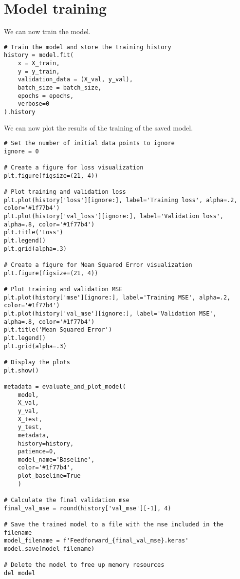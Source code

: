 \section{Model training}

We can now train the model. 
\begin{lstlisting}[style=Python]
# Train the model and store the training history
history = model.fit(
    x = X_train,
    y = y_train,
    validation_data = (X_val, y_val),
    batch_size = batch_size,
    epochs = epochs,
    verbose=0
).history
\end{lstlisting}
We can now plot the results of the training of the saved model. 
\begin{lstlisting}[style=Python]
# Set the number of initial data points to ignore
ignore = 0

# Create a figure for loss visualization
plt.figure(figsize=(21, 4))

# Plot training and validation loss
plt.plot(history['loss'][ignore:], label='Training loss', alpha=.2, color='#1f77b4')
plt.plot(history['val_loss'][ignore:], label='Validation loss', alpha=.8, color='#1f77b4')
plt.title('Loss')
plt.legend()
plt.grid(alpha=.3)

# Create a figure for Mean Squared Error visualization
plt.figure(figsize=(21, 4))

# Plot training and validation MSE
plt.plot(history['mse'][ignore:], label='Training MSE', alpha=.2, color='#1f77b4')
plt.plot(history['val_mse'][ignore:], label='Validation MSE', alpha=.8, color='#1f77b4')
plt.title('Mean Squared Error')
plt.legend()
plt.grid(alpha=.3)

# Display the plots
plt.show()

metadata = evaluate_and_plot_model(
    model,
    X_val,
    y_val,
    X_test,
    y_test,
    metadata,
    history=history,
    patience=0,
    model_name='Baseline',
    color='#1f77b4',
    plot_baseline=True
    )

# Calculate the final validation mse
final_val_mse = round(history['val_mse'][-1], 4)

# Save the trained model to a file with the mse included in the filename
model_filename = f'Feedforward_{final_val_mse}.keras'
model.save(model_filename)

# Delete the model to free up memory resources
del model
\end{lstlisting}